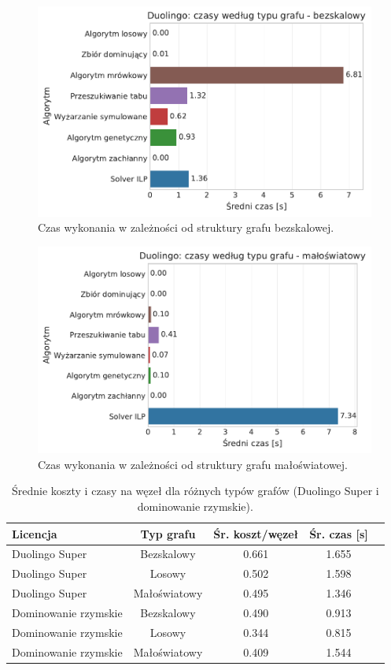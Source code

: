 \begin{figure}[H]
  \centering
  \includegraphics[width=0.65\linewidth]{assets/figures/benchmark/synthetic/duolingo_time_by_graph_scale_free.pdf}
  \caption{Czas wykonania w zależności od struktury grafu bezskalowej.}
  \label{fig:duo-synth-time-scale-free}
\end{figure}

\begin{figure}[H]
  \centering
  \includegraphics[width=0.65\linewidth]{assets/figures/benchmark/synthetic/duolingo_time_by_graph_small_world.pdf}
  \caption{Czas wykonania w zależności od struktury grafu małoświatowej.}
  \label{fig:duo-synth-time-small-world}
\end{figure}

\begin{table}[H]
  \centering
  \caption{Średnie koszty i czasy na węzeł dla różnych typów grafów (Duolingo Super i dominowanie rzymskie).}
  \label{tab:duo-synth-summary-times}
  \begin{tabular}{lcccc}
    \toprule
    \textbf{Licencja}    & \textbf{Typ grafu} & \textbf{Śr. koszt/węzeł} & \textbf{Śr. czas [s]} \\
    \midrule
    Duolingo Super       & Bezskalowy         & 0.661                    & 1.655                 \\
    Duolingo Super       & Losowy             & 0.502                    & 1.598                 \\
    Duolingo Super       & Małoświatowy       & 0.495                    & 1.346                 \\
    Dominowanie rzymskie & Bezskalowy         & 0.490                    & 0.913                 \\
    Dominowanie rzymskie & Losowy             & 0.344                    & 0.815                 \\
    Dominowanie rzymskie & Małoświatowy       & 0.409                    & 1.544                 \\
    \bottomrule
  \end{tabular}
\end{table}

